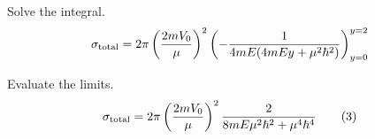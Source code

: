 Solve the integral.
\begin{equation*}
\sigma_{\rm total}=2\pi\left(\frac{2mV_0}{\mu}\right)^2
\left(-\frac{1}{4mE(4mEy+\mu^2\hbar^2)}\right)_{y=0}^{y=2}
\end{equation*}

Evaluate the limits.
\begin{equation*}
\sigma_{\rm total}=2\pi\left(\frac{2mV_0}{\mu}\right)^2
\frac{2}{8mE\mu^2\hbar^2+\mu^4\hbar^4}
\tag{3}
\end{equation*}


